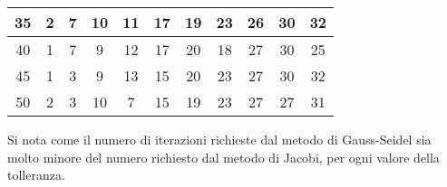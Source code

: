 \begin{sol}
\begin{center}
\begin{tabular}{|c||c|c|c|c|c|c|c|c|c|c|}
        35 & 2 & 7 & 10 & 11 & 17 & 19 & 23 & 26 & 30 & 32 \\ \hline
        40 & 1 & 7 & 9 & 12 & 17 & 20 & 18 & 27 & 30 & 25 \\ \hline
        45 & 1 & 3 & 9 & 13 & 15 & 20 & 23 & 27 & 30 & 32 \\ \hline
        50 & 2 & 3 & 10 & 7 & 15 & 19 & 23 & 27 & 27 & 31 \\ \hline
        \end{tabular}\end{center}
        \normalsize Si nota come il numero di iterazioni richieste dal metodo di Gauss-Seidel sia molto minore del numero richiesto dal metodo di Jacobi, per ogni valore della tolleranza.
      \end{sol}

